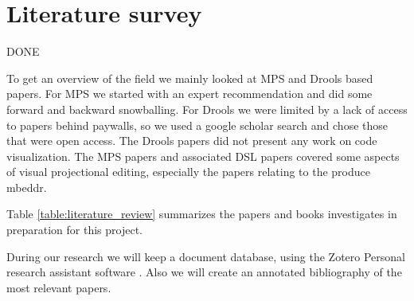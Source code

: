 \section{Literature survey}
{\LARGE DONE}

To get an overview of the field we mainly looked at MPS and Drools based papers.  
For MPS we started with an expert recommendation and did some forward and backward snowballing.
For Drools we were limited by a lack of access to papers behind paywalls, so we used a google scholar search and chose those that were open access.
The Drools papers did not present any work on code visualization. 
The MPS papers and associated DSL papers covered some aspects of visual projectional editing, especially the papers relating to the produce mbeddr.

Table \ref{table:literature_review} summarizes the papers and books investigates in preparation for this project.

During our research we will keep a document database, using the Zotero Personal research assistant software \cite{Zotero_product_page}.
Also we will create an annotated bibliography of the most relevant papers.


